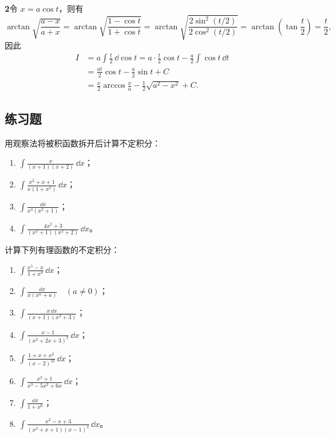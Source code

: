 \begin{xsolution}
\textbf{2}\quad 令 $x=a\cos t$，则有
\[
  \arctan\sqrt{\frac{a-x}{a+x}}
  =\arctan\sqrt{\frac{1-\cos t}{1+\cos t}}
  =\arctan\sqrt{\frac{2\sin^2(t/2)}{2\cos^2(t/2)}}
  =\arctan\left(\tan\frac t2\right)=\frac t2,
\]
因此
\begin{align*}
  I
  &=a\int\frac t2\,\dd\cos t
   =a\cdot\frac t2\cos t-\frac a2\int\cos t\,\dd t\\
  &=\frac{at}2\cos t-\frac a2\sin t+C\\
  &=\frac x2\arccos\frac xa-\frac12\sqrt{a^2-x^2}+C.
\end{align*}
\end{xsolution}

\subsection{练习题}

\begin{xexercise}[1]
用观察法将被积函数拆开后计算不定积分：
  \begin{enumerate}[label=(\arabic*)]
    \item $\displaystyle\int\frac{x}{(x+1)(x+2)}\,\dd x$；
    \item $\displaystyle\int\frac{x^2+x+1}{x(1+x^2)}\,\dd x$；
    \item $\displaystyle\int\frac{\dd x}{x^4(x^2+1)}$；
    \item $\displaystyle\int\frac{4x^2+3}{(x^2+1)(x^2+2)}\,\dd x$。
  \end{enumerate}
\end{xexercise}

\begin{xexercise}[2]
计算下列有理函数的不定积分：
  \begin{enumerate}[label=(\arabic*)]
    \item $\displaystyle\int\frac{x^5-x}{1+x^8}\,\dd x$；
    \item $\displaystyle\int\frac{\dd x}{x(x^n+a)}\quad(a\ne0)$；
    \item $\displaystyle\int\frac{x\,\dd x}{(x+1)(x^2+3)}$；
    \item $\displaystyle\int\frac{x-1}{(x^2+2x+3)^2}\,\dd x$；
    \item $\displaystyle\int\frac{1+x+x^2}{(x-2)^{10}}\,\dd x$；
    \item $\displaystyle\int\frac{x^3+1}{x^3-5x^2+6x}\,\dd x$；
    \item $\displaystyle\int\frac{\dd x}{1+x^6}$；
    \item $\displaystyle\int\frac{x^2-x+3}{(x^2+x+1)(x-1)^2}\,\dd x$。
  \end{enumerate}
\end{xexercise}

